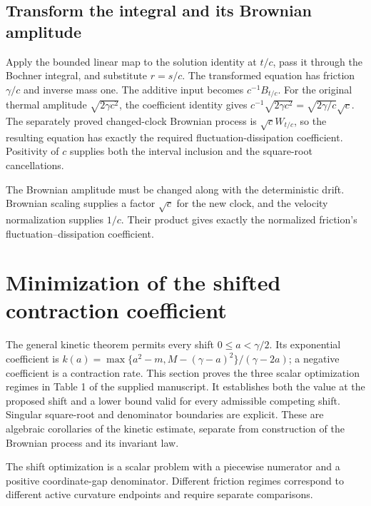 \documentclass[11pt,a4paper]{report}
\begin{document}
\subsection{\texorpdfstring{Transform the integral and its Brownian amplitude}{Transform the integral and its Brownian amplitude}}
\label{report-step-KineticLangevin-MassScaling-lean-2}


Apply the bounded linear map to the solution identity at \(t/c\), pass it through the Bochner integral, and substitute \(r=s/c\). The transformed equation has friction \(\gamma/c\) and inverse mass one. The additive input becomes \(c^{-1}B_{t/c}\). For the original thermal amplitude \(\sqrt{2\gamma c^2}\), the coefficient identity gives \(c^{-1}\sqrt{2\gamma c^2}=\sqrt{2\gamma/c}\sqrt c\). The separately proved changed-clock Brownian process is \(\sqrt c W_{t/c}\), so the resulting equation has exactly the required fluctuation-dissipation coefficient. Positivity of \(c\) supplies both the interval inclusion and the square-root cancellations.



The Brownian amplitude must be changed along with the deterministic drift. Brownian scaling supplies a factor \(\sqrt c\) for the new clock, and the velocity normalization supplies \(1/c\). Their product gives exactly the normalized friction’s fluctuation–dissipation coefficient.

\section{\texorpdfstring{Minimization of the shifted contraction coefficient}{Minimization of the shifted contraction coefficient}}
\label{proof-module-KineticLangevin-Friction-lean}


The general kinetic theorem permits every shift \(0\le a<\gamma/2\). Its exponential coefficient is \(k(a)=\max\{a^2-m,M-(\gamma-a)^2\}/(\gamma-2a)\); a negative coefficient is a contraction rate. This section proves the three scalar optimization regimes in Table 1 of the supplied manuscript. It establishes both the value at the proposed shift and a lower bound valid for every admissible competing shift. Singular square-root and denominator boundaries are explicit. These are algebraic corollaries of the kinetic estimate, separate from construction of the Brownian process and its invariant law.



The shift optimization is a scalar problem with a piecewise numerator and a positive coordinate-gap denominator. Different friction regimes correspond to different active curvature endpoints and require separate comparisons.
\end{document}
